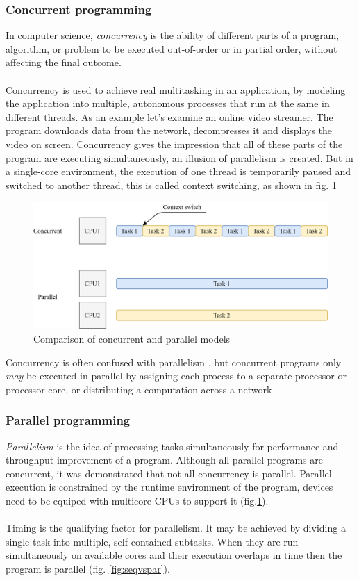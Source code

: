 \subsubsection{Concurrent programming}
In computer science, \emph{concurrency} is the ability of different parts of a program, algorithm, or problem to be executed out-of-order or in partial order, without affecting the final outcome. \cite{lamport1978time}
\\ \\ 
Concurrency is used to achieve real multitasking in an application, by modeling the application into multiple, autonomous processes that run at the same in different threads.
As an example let's examine an online video streamer. The program downloads data from the network, decompresses it and displays the video on screen.
Concurrency gives the impression that all of these parts of the program are executing simultaneously, an illusion of parallelism is created. 
But in a single-core environment, the execution of one thread is temporarily paused and switched to another thread, this is called context switching, as shown in fig. \ref{fig:convspar}

\begin{figure}[htb]
	\centering
		\includegraphics[scale=1.0]{figures02/convspar.png}
	\caption{Comparison of concurrent and parallel models}
	\label{fig:convspar}
\end{figure}

Concurrency is often confused with parallelism \cite{waza}, but concurrent programs only \emph{may} be executed in parallel 
by assigning each process to a separate processor or processor core, or distributing a computation across a network \cite{mordechai}

\subsubsection{Parallel programming}
\emph{Parallelism} is the idea of processing tasks simultaneously for performance and throughput improvement of a program. Although all parallel programs are concurrent, it was demonstrated that not all concurrency is parallel.
Parallel execution is constrained by the runtime environment of the program, devices need to be equiped with multicore CPUs to support it (fig.\ref{fig:convspar}).
\\ \\ 
Timing is the qualifying factor for parallelism. It may be achieved by dividing a single task into multiple, self-contained subtasks. When they are run simultaneously on available cores and their execution overlaps in time then the program is parallel (fig. \ref{fig:seqvspar}).


